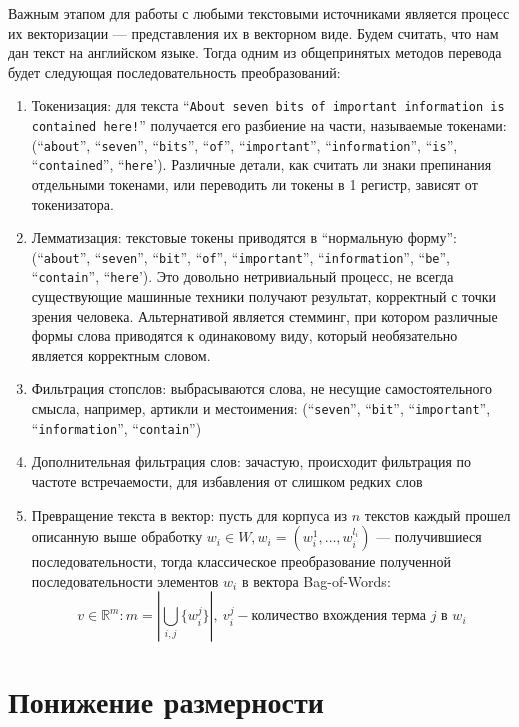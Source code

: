 \documentclass[14pt,a4paper]{extreport}
\begin{document}
Важным этапом для работы с любыми текстовыми источниками является процесс их векторизации --- представления их в векторном
виде. Будем считать, что нам дан текст на английском языке. Тогда одним из общепринятых методов перевода будет следующая
последовательность преобразований:
\begin{enumerate}
\item Токенизация\cite{info_retrieval}: для текста ``\texttt{About seven bits of important information is contained here!}'' получается
его разбиение на части, называемые токенами: (``\texttt{about}'', ``\texttt{seven}'', ``\texttt{bits}'', ``\texttt{of}'',
``\texttt{important}'', ``\texttt{information}'', ``\texttt{is}'', ``\texttt{contained}'', ``\texttt{here}'). Различные детали, как считать ли знаки препинания отдельными токенами, или переводить ли токены в 1 регистр, зависят от
токенизатора.
\item Лемматизация\cite{info_retrieval}: текстовые токены приводятся в ``нормальную форму'':
(``\texttt{about}'', ``\texttt{seven}'', ``\texttt{bit}'', ``\texttt{of}'',
``\texttt{important}'', ``\texttt{information}'', ``\texttt{be}'', ``\texttt{contain}'', ``\texttt{here}').
Это довольно нетривиальный процесс, не всегда существующие машинные техники получают результат, корректный с точки
зрения человека. Альтернативой является стемминг, при котором различные формы слова приводятся к одинаковому виду,
который необязательно является корректным словом.
\item Фильтрация стопслов: выбрасываются слова, не несущие самостоятельного смысла, например, артикли и местоимения:
(``\texttt{seven}'', ``\texttt{bit}'', ``\texttt{important}'', ``\texttt{information}'', ``\texttt{contain}'')
\item Дополнительная фильтрация слов: зачастую, происходит фильтрация по частоте встречаемости, для избавления от слишком редких
слов
\item Превращение текста в вектор: пусть для корпуса из $n$ текстов каждый прошел описанную выше обработку $w_i \in W,
w_i=(w_i^1,\ldots,w_i^{l_i})$ --- получившиеся последовательности, тогда классическое преобразование
полученной последовательности элементов $w_i$ в вектора Bag-of-Words\cite{info_retrieval}:
\begin{equation}
v\in\mathbb{R}^m: m=\left|\bigcup_{i,j} \{w^j_i\}\right|,\ v^j_i - \text{количество вхождения терма } j\text{ в } w_i
\end{equation}
\end{enumerate}

\section{Понижение размерности}
\end{document}
